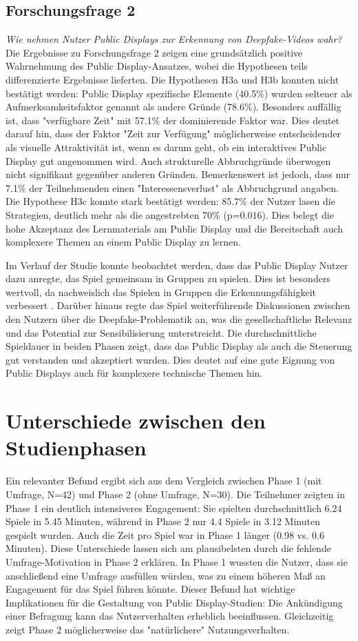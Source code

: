\subsection{Forschungsfrage 2}
\textit{Wie nehmen Nutzer Public Displays zur Erkennung von Deepfake-Videos wahr?}
Die Ergebnisse zu Forschungsfrage 2 zeigen eine grundsätzlich positive Wahrnehmung des Public Display-Ansatzes, 
wobei die Hypothesen teils differenzierte Ergebnisse lieferten. Die Hypothesen H3a und H3b konnten nicht bestätigt werden: 
Public Display spezifische Elemente (40.5\%) wurden seltener als Aufmerksamkeitsfaktor genannt als andere Gründe (78.6\%). 
Besonders auffällig ist, dass "verfügbare Zeit" mit 57.1\% der dominierende Faktor war. 
Dies deutet darauf hin, dass der Faktor "Zeit zur Verfügung" möglicherweise entscheidender als visuelle Attraktivität ist, 
wenn es darum geht, ob ein interaktives Public Display gut angenommen wird. 
Auch strukturelle Abbruchgründe überwogen nicht signifikant gegenüber anderen Gründen. 
Bemerkenswert ist jedoch, dass nur 7.1\% der Teilnehmenden einen "Interessensverlust" als Abbruchgrund angaben.
Die Hypothese H3c konnte stark bestätigt werden: 85.7\% der Nutzer lasen die Strategien, deutlich mehr als die angestrebten 70\% (p=0.016). 
Dies belegt die hohe Akzeptanz des Lernmaterials am Public Display und die Bereitschaft auch komplexere Themen an einem Public Display zu lernen.

Im Verlauf der Studie konnte beobachtet werden, dass das Public Display Nutzer dazu anregte, das Spiel gemeinsam in Gruppen zu spielen. 
Dies ist besonders wertvoll, da nachweislich das Spielen in Gruppen die Erkennungsfähigkeit verbessert \cite{dielHumanPerformanceDetecting2024}. 
Darüber hinaus regte das Spiel weiterführende Diskussionen zwischen den Nutzern über die Deepfake-Problematik an, 
was die gesellschaftliche Relevanz und das Potential zur Sensibilisierung unterstreicht.
Die durchschnittliche Spieldauer in beiden Phasen zeigt, dass das Public Display als auch die Steuerung gut verstanden und akzeptiert wurden. 
Dies deutet auf eine gute Eignung von Public Displays auch für komplexere technische Themen hin.
\section{Unterschiede zwischen den Studienphasen}
Ein relevanter Befund ergibt sich aus dem Vergleich zwischen Phase 1 (mit Umfrage, N=42) und Phase 2 (ohne Umfrage, N=30). 
Die Teilnehmer zeigten in Phase 1 ein deutlich intensiveres Engagement: 
Sie spielten durchschnittlich 6.24 Spiele in 5.45 Minuten, während in Phase 2 nur 4.4 Spiele in 3.12 Minuten gespielt wurden. 
Auch die Zeit pro Spiel war in Phase 1 länger (0.98 vs. 0.6 Minuten).
Diese Unterschiede lassen sich am plausibelsten durch die fehlende Umfrage-Motivation in Phase 2 erklären. 
In Phase 1 wussten die Nutzer, dass sie anschließend eine Umfrage ausfüllen würden, was zu einem höheren Maß an Engagement für das Spiel führen könnte.
Dieser Befund hat wichtige Implikationen für die Gestaltung von Public Display-Studien: 
Die Ankündigung einer Befragung kann das Nutzerverhalten erheblich beeinflussen. 
Gleichzeitig zeigt Phase 2 möglicherweise das "natürlichere" Nutzungsverhalten.

